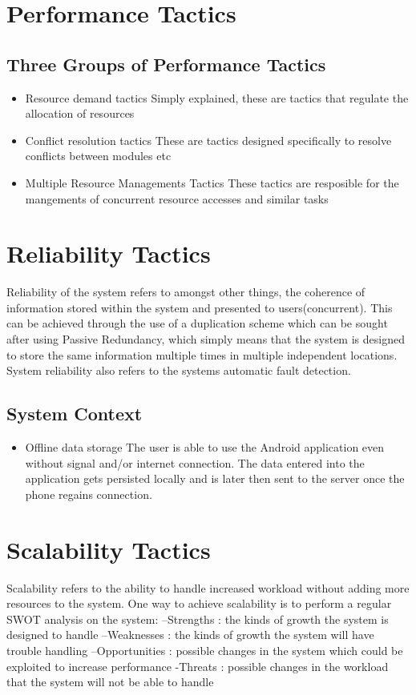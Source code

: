 \documentclass[11pt,fleqn]{book} %
\begin{document}
	\section{Performance Tactics}
	\subsection{Three Groups of Performance Tactics}
		\begin{itemize}
			\item Resource demand tactics\newline
			Simply explained, these are tactics that regulate the allocation of resources
			\item Conflict resolution tactics\newline
			These are tactics designed specifically to resolve conflicts between modules etc
			\item Multiple Resource Managements Tactics\newline
			These tactics are resposible for the mangements of concurrent resource accesses and similar tasks
		\end{itemize}
	\section{Reliability Tactics}
		Reliability of the system refers to amongst other things, the coherence of information stored within the system and presented to users(concurrent). This can be achieved through the use of a duplication scheme which can be sought after using Passive Redundancy, which simply means that the system is designed to store the same information multiple times in multiple independent locations. System reliability also refers to the systems automatic fault detection.
	\subsection{System Context}
		\begin{itemize}
			\item Offline data storage\newline
				The user is able to use the Android application even without signal and/or internet connection. The data entered into the application gets persisted locally and is later then sent to the server once the phone regains connection.
		\end{itemize}
	\section{Scalability Tactics}
	Scalability refers to the ability to handle increased workload without adding more resources to the system. One way to achieve scalability is to perform a regular SWOT analysis on the system:\newline
	–Strengths : the kinds of growth the system is designed to handle\newline
	–Weaknesses : the kinds of growth the system will have trouble handling\newline
	–Opportunities : possible changes in the system which could be exploited to increase performance\newline
	-Threats : possible changes in the workload that the system will not be able to handle
\end{document}
